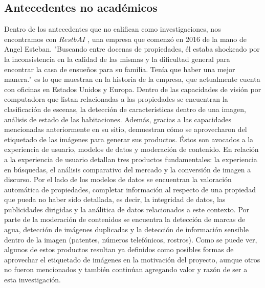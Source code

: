 \subsection{Antecedentes no académicos}
Dentro de los antecedentes que no califican como investigaciones, nos encontramos con \(Restb AI\) \cite{restb_ai}, una empresa que comenzó en 2016 de la mano de Angel Esteban. "Buscando entre docenas de propiedades, él estaba shockeado por la inconsistencia en la calidad de las mismas y la dificultad general para encontrar la casa de ensueños para su familia. Tenía que haber una mejor manera." es lo que muestran en la historia de la empresa, que actualmente cuenta con oficinas en Estados Unidos y Europa.
Dentro de las capacidades de visión por computadora que listan relacionadas a las propiedades se encuentran la clasificación de escenas, la detección de características dentro de una imagen, análisis de estado de las habitaciones.
Además, gracias a las capacidades mencionadas anteriormente en su sitio, demuestran cómo se aprovecharon del etiquetado de las imágenes para generar sus productos. Éstos son avocados a la experiencia de usuario, modelos de datos y moderación de contenido. En relación a la experiencia de usuario detallan tres productos fundamentales: la experiencia en búsquedas, el análisis comparativo del mercado y la conversión de imagen a discurso. Por el lado de los modelos de datos se encuentran la valoración automática de propiedades, completar información al respecto de una propiedad que pueda no haber sido detallada, es decir, la integridad de datos, las publicidades dirigidas y la análitica de datos relacionados a este contexto. Por parte de la moderación de contenidos se encuentra la detección de marcas de agua, detección de imágenes duplicadas y la detección de información sensible dentro de la imagen (patentes, números telefónicos, rostros).
Como se puede ver, algunos de estos productos resultan ya definidos como posibles formas de aprovechar el etiquetado de imágenes en la motivación del proyecto, aunque otros no fueron mencionados y también continúan agregando valor y razón de ser a esta investigación.